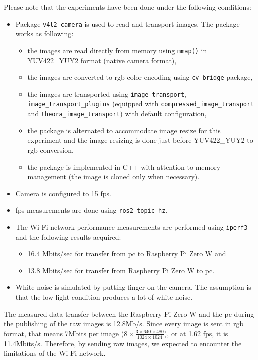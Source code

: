Please note that the experiments have been done under the following conditions:
\begin{itemize}
    \item Package \texttt{v4l2\_camera} is used to read and transport images. The package works as following:
        \begin{itemize}
            \item the images are read directly from memory using \texttt{mmap()} in YUV422\_YUY2 format (native camera format),
            \item the images are converted to \ac{rgb} color encoding using \texttt{cv\_bridge} package,
            \item the images are transported using \texttt{image\_transport}, \texttt{image\_transport\_plugins} (equipped with \texttt{compressed\_image\_transport} and \texttt{theora\_image\_transport}) with default configuration,
            \item the package is alternated to accommodate image resize for this experiment and the image resizing is done just before YUV422\_YUY2 to \ac{rgb} conversion,
            \item the package is implemented in C++ with attention to memory management (the image is cloned only when necessary).
        \end{itemize}
    \item Camera is configured to 15 \ac{fps}.
    \item \ac{fps} measurements are done using \texttt{ros2 topic hz}.
    \item The Wi-Fi network performance measurements are performed using \texttt{iperf3} and the following results acquired:
        \begin{itemize}
            \item 16.4 Mbits/sec for transfer from \ac{pc} to Raspberry Pi Zero W and
            \item 13.8 Mbits/sec for transfer from Raspberry Pi Zero W to \ac{pc}.
        \end{itemize}
    \item White noise is simulated by putting finger on the camera.
    The assumption is that the low light condition produces a lot of white noise. 
\end{itemize}

The measured data transfer between the Raspberry Pi Zero W and the \ac{pc} during the publishing of the raw images is 12.8Mb/s.
Since every image is sent in \ac{rgb} format, that means 7Mbits per image ($ 8 \times \frac{ 3 \times 640 \times 480 }{1024 \times 1024}$), or at 1.62 \ac{fps}, it is 11.4Mbits/s.
Therefore, by sending raw images, we expected to encounter the limitations of the Wi-Fi network.

